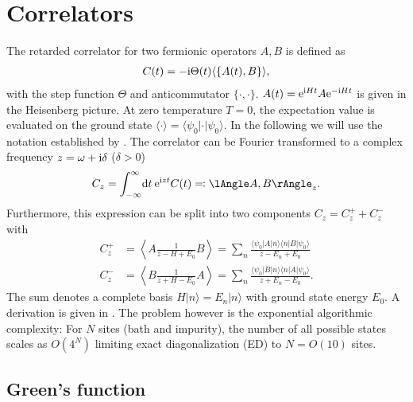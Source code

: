 \section{Correlators}

The retarded correlator for two fermionic operators $A, B$ is defined as
\begin{align}
    C(t) = -\mathrm{i} \Theta(t) \langle\{A(t), B\}\rangle,
\end{align}
with the step function $\Theta$ and anticommutator $\{\cdot,\cdot\}$.
$A(t) = \mathrm{e}^{\mathrm{i} H t} A \mathrm{e}^{-\mathrm{i} H t}$ is given in the Heisenberg picture.
At zero temperature $T=0$, the expectation value is evaluated on the ground state
$\langle\cdot\rangle = \langle\psi_0 | \cdot | \psi_0\rangle$.
In the following we will use the notation established by \cite{Bulla1998}.
The correlator can be Fourier transformed to
a complex frequency $z = \omega + \mathrm{i} \delta$ ($\delta > 0$)
\begin{align}
    C_z = \int_{-\infty}^\infty\! \md t\> \me^{\mi zt} C(t) \eqqcolon \lAngle A, B \rAngle_z.
\end{align}
Furthermore, this expression can be split into two components $C_z = C^+_z + C^-_z$ with
\begin{subequations}
    \begin{align}
        C^+_z
         & =
        \left\langle A \frac{1}{z - H + E_0} B\right\rangle
        =
        \sum_n \frac{\langle\psi_0 | A | n\rangle\langle n | B | \psi_0\rangle}{z - E_n + E_0}
        \\
        C^-_z
         & =
        \left\langle B \frac{1}{z + H - E_0} A\right\rangle
        =
        \sum_n \frac{\langle\psi_0 | B | n\rangle\langle n | A | \psi_0\rangle}{z + E_n - E_0}.
    \end{align}
\end{subequations}
The sum denotes a complete basis $H|n\rangle = E_n|n\rangle$ with ground state energy $E_0$.
A derivation is given in .
The problem however is the exponential algorithmic complexity:
For $N$ sites (bath and impurity), the number of all possible states scales as $O(4^N)$
limiting exact diagonalization (ED) to $N=O(10)$ sites.

\subsection{Green's function}

